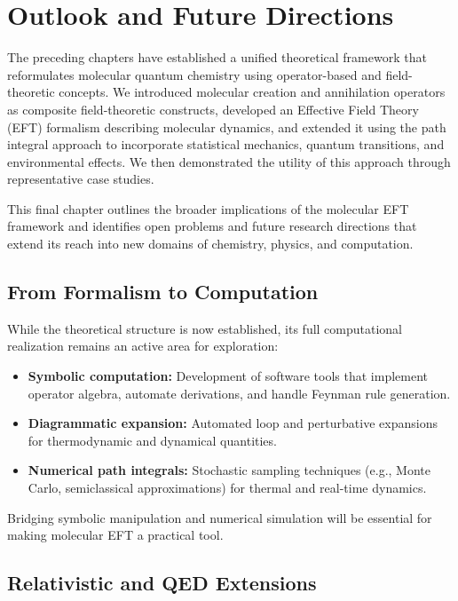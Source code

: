 
\chapter{Outlook and Future Directions}
\label{chap:outlook}

The preceding chapters have established a unified theoretical framework that reformulates molecular quantum chemistry using operator-based and field-theoretic concepts. We introduced molecular creation and annihilation operators as composite field-theoretic constructs, developed an Effective Field Theory (EFT) formalism describing molecular dynamics, and extended it using the path integral approach to incorporate statistical mechanics, quantum transitions, and environmental effects. We then demonstrated the utility of this approach through representative case studies.

This final chapter outlines the broader implications of the molecular EFT framework and identifies open problems and future research directions that extend its reach into new domains of chemistry, physics, and computation.

\section{From Formalism to Computation}

While the theoretical structure is now established, its full computational realization remains an active area for exploration:
\begin{itemize}
  \item \textbf{Symbolic computation:} Development of software tools that implement operator algebra, automate derivations, and handle Feynman rule generation.
  \item \textbf{Diagrammatic expansion:} Automated loop and perturbative expansions for thermodynamic and dynamical quantities.
  \item \textbf{Numerical path integrals:} Stochastic sampling techniques (e.g., Monte Carlo, semiclassical approximations) for thermal and real-time dynamics.
\end{itemize}

Bridging symbolic manipulation and numerical simulation will be essential for making molecular EFT a practical tool.

\section{Relativistic and QED Extensions}

